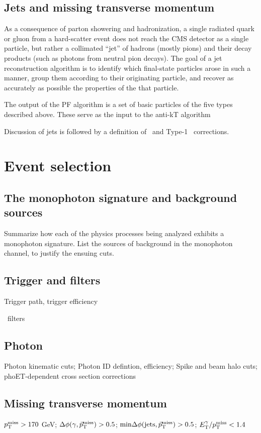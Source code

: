 \documentclass[oneside, letterpaper, 12pt, oldfontcommands]{memoir}
\begin{document}
\section{Jets and missing transverse momentum} \label{sec:reconstruction_jetmet}
As a consequence of parton showering and hadronization, a single radiated quark or gluon from a hard-scatter event does not reach the CMS detector
as a single particle, but rather a collimated ``jet'' of hadrons (mostly pions) and their decay products (such as photons from neutral pion decays).
The goal of a jet reconstruction algorithm is to identify which final-state particles arose in such a manner, group them according to their originating
particle, and recover as accurately as possible the properties of the that particle.

The output of the PF algorithm is a set of basic particles of the five types described above. These serve as the input to the anti-kT algorithm

Discussion of jets is followed by a definition of \MET\ and Type-1 \MET\ corrections.

\chapter{Event selection} \label{chap:event_selection}
\section{The monophoton signature and background sources} \label{sec:event_selection_backgrounds}
Summarize how each of the physics processes being analyzed exhibits a monophoton signature.
List the sources of background in the monophoton channel, to justify the ensuing cuts.
\section{Trigger and \texorpdfstring{\MET}{pTmiss} filters} \label{sec:event_selection_trigger_METfilters}
Trigger path, trigger efficiency

\MET\ filters
\section{Photon} \label{sec:event_selection_photon}
Photon kinematic cuts; Photon ID defintion, efficiency; Spike and beam halo cuts; phoET-dependent cross section corrections

\section{Missing transverse momentum} \label{sec:event_selection_MET}
$p_\mathrm{T}^\mathrm{miss} > 170$ GeV; $\Delta\phi(\gamma,\vec{p}_\mathrm{T}^\mathrm{miss}) > 0.5$; $\mathrm{min}\Delta\phi(\mathrm{jets},\vec{p}_\mathrm{T}^\mathrm{miss}) > 0.5$;
$E_\mathrm{T}^{\gamma}/p_\mathrm{T}^\mathrm{miss} < 1.4$
\end{document}
